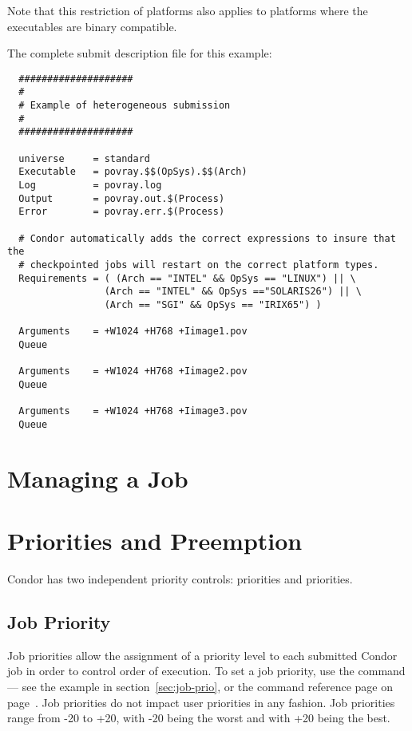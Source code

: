 Note that this restriction of platforms also applies to platforms where
the executables are binary compatible.

The complete submit description file for this example:

\begin{verbatim}
  ####################
  #
  # Example of heterogeneous submission
  #
  ####################

  universe     = standard
  Executable   = povray.$$(OpSys).$$(Arch)
  Log          = povray.log
  Output       = povray.out.$(Process)
  Error        = povray.err.$(Process)

  # Condor automatically adds the correct expressions to insure that the
  # checkpointed jobs will restart on the correct platform types.
  Requirements = ( (Arch == "INTEL" && OpSys == "LINUX") || \
                 (Arch == "INTEL" && OpSys =="SOLARIS26") || \
                 (Arch == "SGI" && OpSys == "IRIX65") )

  Arguments    = +W1024 +H768 +Iimage1.pov
  Queue 

  Arguments    = +W1024 +H768 +Iimage2.pov
  Queue 

  Arguments    = +W1024 +H768 +Iimage3.pov
  Queue 
\end{verbatim}

\section{Managing a Job}


\section{\label{sec:Priorities}Priorities and Preemption}

Condor has two independent priority controls: 
priorities and  priorities.  

\subsection{Job Priority}

Job priorities allow the assignment of a priority level to
each submitted Condor job in order to
control order of execution.
To set a job priority, use the  command
--- see the example in section~\ref{sec:job-prio}, or the
command reference page on page~\pageref{man-condor-prio}.
Job priorities do not impact user priorities in any fashion.
Job priorities range from -20 to +20,
with -20 being the worst and with +20 being the best.

